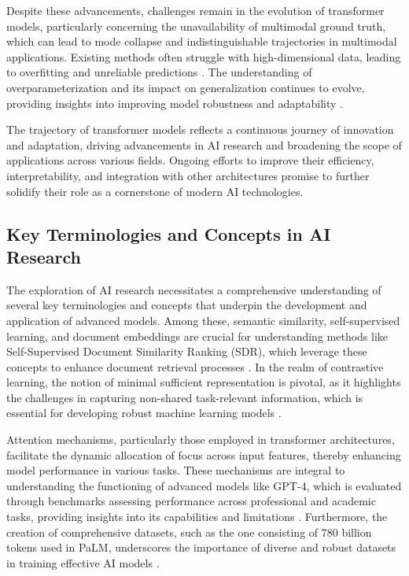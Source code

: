 Despite these advancements, challenges remain in the evolution of transformer models, particularly concerning the unavailability of multimodal ground truth, which can lead to mode collapse and indistinguishable trajectories in multimodal applications. Existing methods often struggle with high-dimensional data, leading to overfitting and unreliable predictions \cite{huang2023dataefficientprotein3dgeometric}. The understanding of overparameterization and its impact on generalization continues to evolve, providing insights into improving model robustness and adaptability \cite{goldfarb2022analysiscatastrophicforgettingrandom}.



The trajectory of transformer models reflects a continuous journey of innovation and adaptation, driving advancements in AI research and broadening the scope of applications across various fields. Ongoing efforts to improve their efficiency, interpretability, and integration with other architectures promise to further solidify their role as a cornerstone of modern AI technologies.



\subsection{Key Terminologies and Concepts in AI Research} \label{subsec:Key Terminologies and Concepts in AI Research}

The exploration of AI research necessitates a comprehensive understanding of several key terminologies and concepts that underpin the development and application of advanced models. Among these, semantic similarity, self-supervised learning, and document embeddings are crucial for understanding methods like Self-Supervised Document Similarity Ranking (SDR), which leverage these concepts to enhance document retrieval processes \cite{ginzburg2021selfsuperviseddocumentsimilarityranking}. In the realm of contrastive learning, the notion of minimal sufficient representation is pivotal, as it highlights the challenges in capturing non-shared task-relevant information, which is essential for developing robust machine learning models \cite{wang2022rethinkingminimalsufficientrepresentation}.



Attention mechanisms, particularly those employed in transformer architectures, facilitate the dynamic allocation of focus across input features, thereby enhancing model performance in various tasks. These mechanisms are integral to understanding the functioning of advanced models like GPT-4, which is evaluated through benchmarks assessing performance across professional and academic tasks, providing insights into its capabilities and limitations \cite{GPT-4Techn0}. Furthermore, the creation of comprehensive datasets, such as the one consisting of 780 billion tokens used in PaLM, underscores the importance of diverse and robust datasets in training effective AI models \cite{chowdhery2023palm}.



